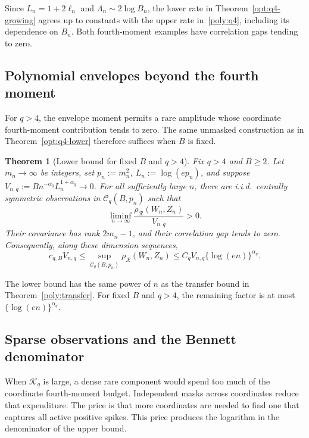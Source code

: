 \documentclass[11pt,letterpaper]{article}
\newtheorem{theorem}{Theorem}
\theoremstyle{remark}
\newcommand{\rh}{\rho_{\mathcal R}}
\begin{document}
Since \(L_n=1+2\ell_n\) and \(\Lambda_n\sim2\log B_n\), the lower
rate in Theorem~\ref{opt:q4-growing} agrees up to constants with
the upper rate in~\eqref{poly:q4}, including its dependence on \(B_n\).
Both fourth-moment examples have correlation gaps tending to zero.

\subsection{Polynomial envelopes beyond the fourth moment}

For \(q>4\), the envelope moment permits a rare amplitude whose
coordinate fourth-moment contribution tends to zero. The same unmasked construction as in
Theorem~\ref{opt:q4-lower} therefore suffices when \(B\) is fixed.

\begin{theorem}[Lower bound for fixed \(B\) and \(q>4\)]\label{lower:dense}
Fix \(q>4\) and \(B\ge2\). Let \(m_n\to\infty\) be integers, set
\(p_n:=m_n^2\), \(L_n:=\log(ep_n)\), and suppose
\(V_{n,q}:=Bn^{-\alpha_q}L_n^{1+\alpha_q}\to0\).
For all sufficiently large \(n\), there are i.i.d.\ centrally symmetric
observations in \(\mathcal C_q(B,p_n)\) such that
\begin{equation}
 \liminf_{n\to\infty}\frac{\rh(W_n,Z_n)}{V_{n,q}}>0.
 \label{lower:dense-rate}
\end{equation}
Their covariance has rank \(2m_n-1\), and their correlation gap tends
to zero. Consequently, along these dimension sequences,
\[
 c_{q,B}V_{n,q}
 \le\sup_{\mathcal C_q(B,p_n)}\rh(W_n,Z_n)
 \le C_qV_{n,q}\{\log(en)\}^{\alpha_q}.
\]
\end{theorem}

The lower bound has the same power of \(n\) as the transfer bound in
Theorem~\ref{poly:transfer}. For fixed \(B\) and \(q>4\), the remaining
factor is at most \(\{\log(en)\}^{\alpha_q}\).

\subsection{Sparse observations and the Bennett denominator}

When \(\mathcal K_q\) is large, a dense rare component would spend too much of
the coordinate fourth-moment budget. Independent masks across coordinates
reduce that expenditure. The price is that more coordinates are needed
to find one that captures all active positive spikes. This price produces
the logarithm in the denominator of the upper bound.
\end{document}
